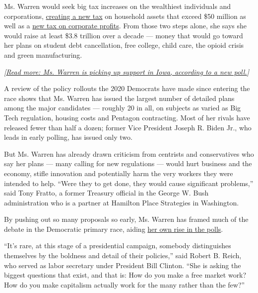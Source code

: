 Ms. Warren would seek big tax increases on the wealthiest individuals
and corporations,
\href{https://www.nytimes.com/2019/01/24/us/politics/wealth-tax-democrats.html}{creating
a new tax} on household assets that exceed \$50 million as well as a
\href{https://www.nytimes.com/2019/04/29/us/politics/democrats-taxes-2020.html}{new
tax on corporate profits}. From those two steps alone, she says she
would raise at least \$3.8 trillion over a decade --- money that would
go toward her plans on student debt cancellation, free college, child
care, the opioid crisis and green manufacturing.

\emph{{[}}\href{https://www.nytimes.com/2019/06/08/us/politics/iowa-poll-2020-democrats.html?action=click\&module=Intentional\&pgtype=Article}{\emph{Read
more: Ms. Warren is picking up support in Iowa, according to a new
poll.}}\emph{{]}}

A review of the policy rollouts the 2020 Democrats have made since
entering the race shows that Ms. Warren has issued the largest number of
detailed plans among the major candidates --- roughly 20 in all, on
subjects as varied as Big Tech regulation, housing costs and Pentagon
contracting. Most of her rivals have released fewer than half a dozen;
former Vice President Joseph R. Biden Jr., who leads in early polling,
has issued only two.

But Ms. Warren has already drawn criticism from centrists and
conservatives who say her plans --- many calling for new regulations ---
would hurt business and the economy, stifle innovation and potentially
harm the very workers they were intended to help. ``Were they to get
done, they would cause significant problems,'' said Tony Fratto, a
former Treasury official in the George W. Bush administration who is a
partner at Hamilton Place Strategies in Washington.

By pushing out so many proposals so early, Ms. Warren has framed much of
the debate in the Democratic primary race, aiding
\href{https://www.nytimes.com/2019/06/08/us/politics/iowa-poll-2020-democrats.html}{her
own rise in the polls}.

``It's rare, at this stage of a presidential campaign, somebody
distinguishes themselves by the boldness and detail of their policies,''
said Robert B. Reich, who served as labor secretary under President Bill
Clinton. ``She is asking the biggest questions that exist, and that is:
How do you make a free market work? How do you make capitalism actually
work for the many rather than the few?''

